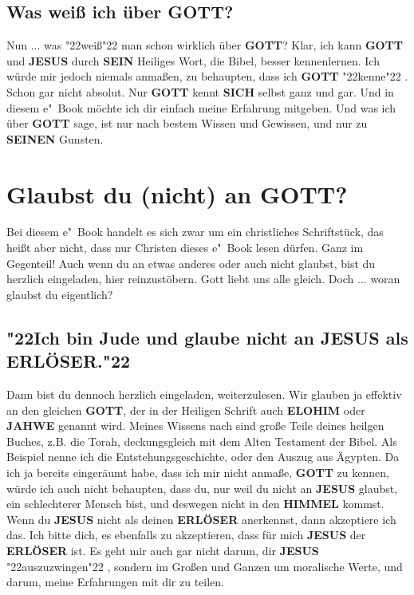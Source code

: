 \documentclass[10pt,a5paper]{article}
\newcommand{\Elohim}[0]{\textbf{ELOHIM}}
\newcommand{\Erloeser}[0]{\textbf{ERL\"OSER}}
\newcommand{\Gott}[0]{\textbf{GOTT}}
\newcommand{\Himmel}[0]{\textbf{HIMMEL}}
\newcommand{\Jahwe}[0]{\textbf{JAHWE}}
\newcommand{\Jesus}[0]{\textbf{JESUS}}
\newcommand{\Seinen}[0]{\textbf{SEINEN}}
\newcommand{\Sein}[0]{\textbf{SEIN}}
\newcommand{\Sich}[0]{\textbf{SICH}}
\newcommand{\q}[1]{\char"22{#1}\char"22 }
\begin{document}
	\subsection{Was wei{\ss} ich \"uber {\Gott}?}
		Nun ... was \q{wei{\ss}} man schon wirklich \"uber {\Gott}?
		Klar,
		ich kann {\Gott} und {\Jesus} durch {\Sein} Heiliges Wort,
		die Bibel,
		besser kennenlernen.
		Ich w\"urde mir jedoch niemals anma{\ss}en,
		zu behaupten,
		dass ich {\Gott} \q{kenne}.
		Schon gar nicht absolut.
		Nur {\Gott} kennt {\Sich} selbst ganz und gar.
		Und in diesem e"~Book m\"ochte ich dir einfach meine Erfahrung mitgeben.
		Und was ich \"uber {\Gott} sage,
		ist nur nach bestem Wissen und Gewissen,
		und nur zu {\Seinen} Gunsten.

	\newpage
	\section{Glaubst du (nicht) an {\Gott}?}
		Bei diesem e"~Book handelt es sich zwar um ein christliches Schriftst\"uck,
		das hei{\ss}t aber nicht,
		dass nur Christen dieses e"~Book lesen d\"urfen.
		Ganz im Gegenteil!
		Auch wenn du an etwas anderes oder auch nicht glaubst,
		bist du herzlich eingeladen,
		hier reinzust\"obern.
		Gott liebt uns alle gleich.
		Doch ... woran glaubst du eigentlich?
	
	\subsection{\q{Ich bin Jude und glaube nicht an {\Jesus} als {\Erloeser}.}}
		Dann bist du dennoch herzlich eingeladen,
		weiterzulesen.
		Wir glauben ja effektiv an den gleichen {\Gott},
		der in der Heiligen Schrift auch {\Elohim} oder {\Jahwe} genannt wird.
		Meines Wissens nach sind gro{\ss}e Teile deines heilgen Buches,
		z.B. die Torah,
		deckungsgleich mit dem Alten Testament der Bibel.
		Als Beispiel nenne ich die Entstehungsgeschichte,
		oder den Auszug aus \"Agypten.		
		Da ich ja bereits einger\"aumt habe,
		dass ich mir nicht anma{\ss}e,
		{\Gott} zu kennen,
		w\"urde ich auch nicht behaupten,
		dass du,
		nur weil du nicht an {\Jesus} glaubst,
		ein schlechterer Mensch bist,
		und deswegen nicht in den {\Himmel} kommst.
		Wenn du {\Jesus} nicht als deinen {\Erloeser} anerkennst,
		dann akzeptiere ich das.
		Ich bitte dich,
		es ebenfalls zu akzeptieren,
		dass f\"ur mich {\Jesus} der {\Erloeser} ist.
		Es geht mir auch gar nicht darum,
		dir {\Jesus} \q{auszuzwingen},
		sondern im Gro{\ss}en und Ganzen um moralische Werte,
		und darum,
		meine Erfahrungen mit dir zu teilen.
		
\end{document}
